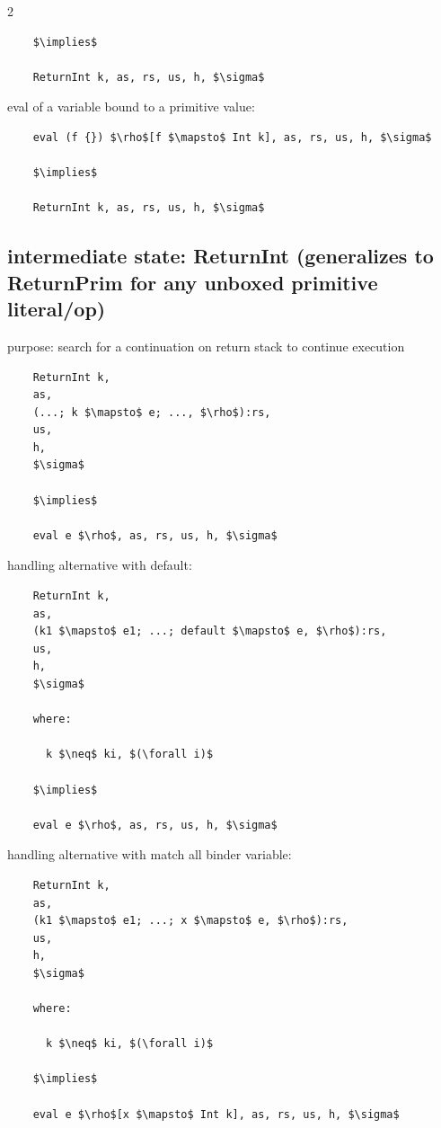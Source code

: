 \documentclass[8pt]{extarticle}
\begin{document}
\begin{multicols*}{2}
\begin{lstlisting}
    $\implies$

    ReturnInt k, as, rs, us, h, $\sigma$
  \end{lstlisting}

  eval of a variable bound to a primitive value:
  
  \begin{lstlisting}
    eval (f {}) $\rho$[f $\mapsto$ Int k], as, rs, us, h, $\sigma$

    $\implies$

    ReturnInt k, as, rs, us, h, $\sigma$
  \end{lstlisting}

  \subsection{intermediate state: ReturnInt (generalizes to ReturnPrim for any unboxed primitive literal/op)}

  purpose: search for a continuation on return stack to continue execution

  \begin{lstlisting}
    ReturnInt k,
    as,
    (...; k $\mapsto$ e; ..., $\rho$):rs,
    us,
    h,
    $\sigma$

    $\implies$

    eval e $\rho$, as, rs, us, h, $\sigma$
  \end{lstlisting}

  handling alternative with default:

  \begin{lstlisting}
    ReturnInt k,
    as,
    (k1 $\mapsto$ e1; ...; default $\mapsto$ e, $\rho$):rs,
    us,
    h,
    $\sigma$

    where:

      k $\neq$ ki, $(\forall i)$

    $\implies$
    
    eval e $\rho$, as, rs, us, h, $\sigma$
  \end{lstlisting}

  handling alternative with match all binder variable:

  \begin{lstlisting}
    ReturnInt k,
    as,
    (k1 $\mapsto$ e1; ...; x $\mapsto$ e, $\rho$):rs,
    us,
    h,
    $\sigma$

    where:

      k $\neq$ ki, $(\forall i)$

    $\implies$
    
    eval e $\rho$[x $\mapsto$ Int k], as, rs, us, h, $\sigma$
  \end{lstlisting}


\end{multicols*}
\end{document}
